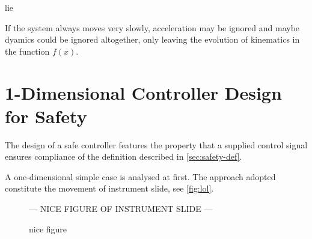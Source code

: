 \gls{lie}

If the system always moves very slowly, acceleration may be ignored and maybe dyamics could be ignored altogether, only leaving the evolution of kinematics in the function $f(x)$.

\section{1-Dimensional Controller Design for Safety}
The design of a safe controller features the property that a supplied control signal ensures compliance of the definition described in \autoref{sec:safety-def}.

A one-dimensional simple case is analysed at first. The approach adopted constitute the movement of instrument slide, see \autoref{fig:lol}.

\begin{figure}[H]
\center
--- NICE FIGURE OF INSTRUMENT SLIDE ---
\caption{nice figure}
\label{fig:lol}
\end{figure}

